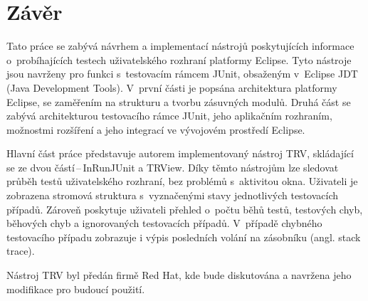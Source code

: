 \chapter{Závěr}                                                           %
Tato práce se zabývá návrhem a implementací nástrojů poskytujících informace o~probíhajících testech uživatelského rozhraní platformy Eclipse. Tyto nástroje  jsou navrženy pro funkci s~testovacím rámcem JUnit, obsaženým v~Eclipse JDT (Java Development Tools). V~první části je popsána architektura platformy Eclipse, se zaměřením na strukturu a tvorbu zásuvných modulů. Druhá část se zabývá architekturou testovacího rámce JUnit, jeho aplikačním rozhraním, možnostmi rozšíření a jeho integrací ve vývojovém prostředí Eclipse.

Hlavní část práce představuje autorem implementovaný nástroj TRV, skládající se ze dvou částí\,--\,InRunJUnit a TRView. Díky těmto nástrojům lze sledovat průběh testů uživatelského rozhraní, bez problémů s~aktivitou okna. Uživateli je zobrazena stromová struktura s~vyznačenými stavy jednotlivých testovacích případů. Zároveň poskytuje uživateli přehled o~počtu běhů testů, testových chyb, běhových chyb a ignorovaných testovacích případů. V~případě chybného testovacího případu zobrazuje i výpis posledních volání na zásobníku (angl. stack trace).

Nástroj TRV byl předán firmě Red Hat, kde bude diskutována a navržena jeho modifikace pro budoucí použití. 
